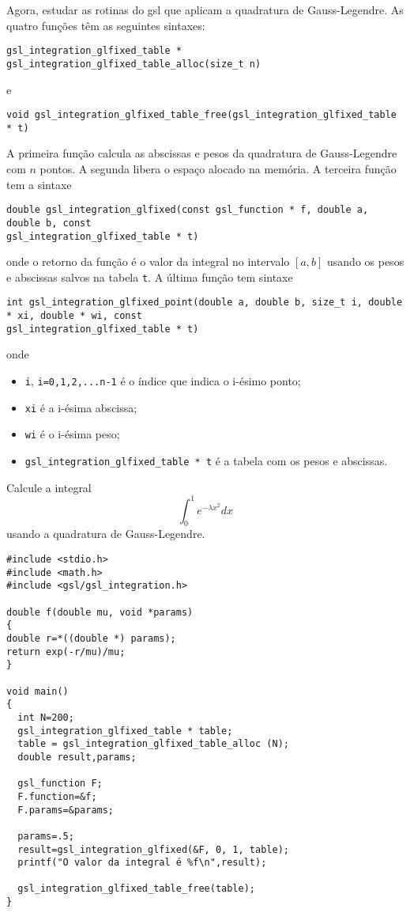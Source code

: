 Agora, estudar as rotinas do gsl que aplicam a quadratura de Gauss-Legendre. As quatro funções têm as seguintes sintaxes:
\begin{verbatim}
gsl_integration_glfixed_table * gsl_integration_glfixed_table_alloc(size_t n)
\end{verbatim}
e
\begin{verbatim}
void gsl_integration_glfixed_table_free(gsl_integration_glfixed_table * t)
\end{verbatim}
A primeira função calcula as abscissas e pesos da quadratura de Gauss-Legendre com $n$ pontos. A segunda libera o espaço alocado na memória. A terceira função tem a sintaxe
\begin{verbatim}
double gsl_integration_glfixed(const gsl_function * f, double a, double b, const 
gsl_integration_glfixed_table * t)
\end{verbatim}
onde o retorno da função é o valor da integral no intervalo $[a,b]$ usando os pesos e abscissas salvos na tabela \verb|t|. A última função tem sintaxe
\begin{verbatim}
int gsl_integration_glfixed_point(double a, double b, size_t i, double * xi, double * wi, const 
gsl_integration_glfixed_table * t)
\end{verbatim}
onde
\begin{itemize}
 \item \verb|i|, \verb|i=0,1,2,...n-1| é o índice que indica o i-ésimo ponto;
 \item \verb|xi| é a i-ésima abscissa;
 \item \verb|wi| é o i-ésima peso;
 \item \verb|gsl_integration_glfixed_table * t| é a tabela com os pesos e abscissas.
\end{itemize}


\begin{ex}
Calcule a integral
$$
\int_0^1 e^{-\lambda x^2}dx
$$
usando a quadratura de Gauss-Legendre.
\end{ex}
\begin{verbatim}
#include <stdio.h>
#include <math.h>
#include <gsl/gsl_integration.h>

double f(double mu, void *params)
{
double r=*((double *) params);
return exp(-r/mu)/mu;
}

void main()
{
  int N=200;
  gsl_integration_glfixed_table * table;
  table = gsl_integration_glfixed_table_alloc (N);
  double result,params;

  gsl_function F;
  F.function=&f;
  F.params=&params;

  params=.5;
  result=gsl_integration_glfixed(&F, 0, 1, table);
  printf("O valor da integral é %f\n",result);

  gsl_integration_glfixed_table_free(table);
}
\end{verbatim}

